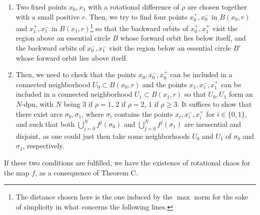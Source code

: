 \documentclass[12pt,a4paper]{amsart}
\theoremstyle{definition}
\theoremstyle{remark}
\begin{document}
\begin{enumerate}

\item Two fixed points $x_0,x_1$ with a rotational difference of $\rho$ are chosen together
with a small positive $r$. Then, we try to find four points $x_0^+,x_0^-$ in $B(x_0,r)$ and
$x_1^+,x_1^-$ in $B(x_1,r)$\footnote{The distance chosen here is  the one induced by the $\max$ norm for the sake of simplicity in what concerns the following lines.} so that the backward orbits of $x_0^+,x_1^+$ visit the region above an essential circle $B$ whose forward orbit
lies below itself, and the backward orbits of $x_0^-,x_1^-$ visit the region below an essential circle  $B'$ whose forward orbit lies above itself.

\item Then, we need to check that the points $x_0,x_0^-,x_0^+$ can be included in a connected neighborhood
$U_0\subset B(x_0,r)$ and the points $x_1,x_1^-,x_1^+$ can be included in a connected neighborhood
$U_1\subset B(x_1,r)$ so that $U_0,U_1$ form an $N$-dpn, with $N$ being 3 if $\rho=1$, 2 if $\rho=2$, 
$1$ if $\rho\geq 3$.
It suffices to show that there exist arcs $\sigma_0, \sigma_1$, where $\sigma_i$ contains the points $x_i,x_i^-,x_i^+$ for $i\in\{0,1\}$, and such that both $\bigcup_{j=0}^{N}f^j(\sigma_0)$ and $\bigcup_{j=0}^{N}f^j(\sigma_1)$ are inessential and disjoint, as one could just then take some neighborhoods $U_0$ and $U_1$ of $\sigma_0$ and $\sigma_1$, respectively. 



\end{enumerate}

If these two conditions are fulfilled, we have the existence of rotational chaos for the map $f$, as a consequence of
Theorem C.

\smallskip
\end{document}
